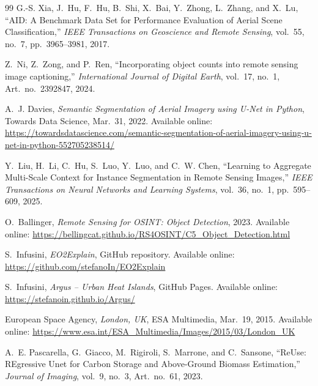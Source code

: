 \documentclass[11pt,a4paper]{article}
\begin{document}
\begin{thebibliography}{99}
G.-S. Xia, J.~Hu, F.~Hu, B.~Shi, X.~Bai, Y.~Zhong, L.~Zhang,
and X.~Lu,
``AID: A Benchmark Data Set for Performance Evaluation of Aerial
Scene Classification,''
\textit{IEEE Transactions on Geoscience and Remote Sensing},
vol.~55, no.~7, pp.~3965--3981, 2017.

Z.~Ni, Z.~Zong, and P.~Ren,
``Incorporating object counts into remote sensing image captioning,''
\textit{International Journal of Digital Earth},
vol.~17, no.~1, Art.~no.~2392847, 2024.

A.~J. Davies,
\textit{Semantic Segmentation of Aerial Imagery using U-Net in Python},
Towards Data Science, Mar.~31, 2022.
Available online:
\url{https://towardsdatascience.com/semantic-segmentation-of-aerial-imagery-using-u-net-in-python-552705238514/}

Y.~Liu, H.~Li, C.~Hu, S.~Luo, Y.~Luo, and C.~W. Chen,
``Learning to Aggregate Multi-Scale Context for Instance Segmentation
in Remote Sensing Images,''
\textit{IEEE Transactions on Neural Networks and Learning Systems},
vol.~36, no.~1, pp.~595--609, 2025.

O.~Ballinger,
\textit{Remote Sensing for OSINT: Object Detection},
2023.
Available online:
\url{https://bellingcat.github.io/RS4OSINT/C5_Object_Detection.html}

S.~Infusini,
\textit{EO2Explain},
GitHub repository.
Available online:
\url{https://github.com/stefanoIn/EO2Explain}

S.~Infusini,
\textit{Argus -- Urban Heat Islands},
GitHub Pages.
Available online:
\url{https://stefanoin.github.io/Argus/}


European Space Agency,
\textit{London, UK},
ESA Multimedia, Mar.~19, 2015.
Available online:
\url{https://www.esa.int/ESA_Multimedia/Images/2015/03/London_UK}

A.~E. Pascarella, G.~Giacco, M.~Rigiroli, S.~Marrone, and C.~Sansone,
``ReUse: REgressive Unet for Carbon Storage and Above-Ground Biomass
Estimation,''
\textit{Journal of Imaging},
vol.~9, no.~3, Art.~no.~61, 2023.

\end{thebibliography}
\end{document}
